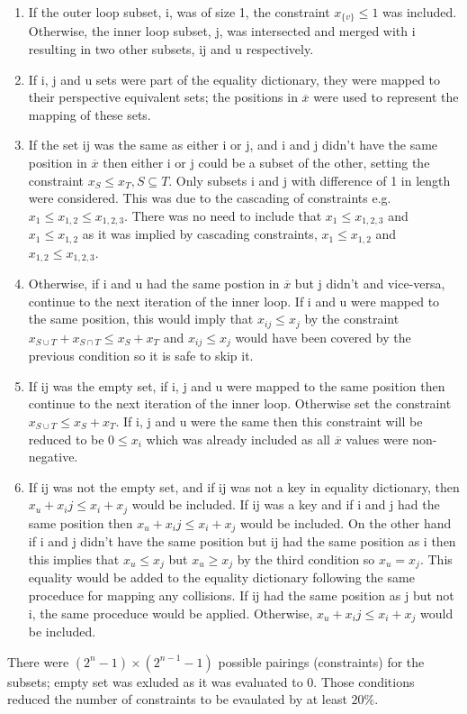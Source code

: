 \documentclass[11pt]{article}
\begin{document}
    \begin{enumerate}
        \item If the outer loop subset, i, was of size 1, the constraint $x_{\{v\}} \le 1$ was included. Otherwise, the inner loop subset, j, was intersected and merged with i resulting in two other subsets, ij and u respectively.
        \item If i, j and u sets were part of the equality dictionary, they were mapped to their perspective equivalent sets; the positions in $\overline{x}$ were used to represent the mapping of these sets. 
        \item If the set ij was the same as either i or j, and i and j didn't have the same position in $\overline{x}$ then either i or j could be a subset of the other, setting the constraint $x_S \le x_T, S\subseteq T$. Only subsets i and j with difference of 1 in length were considered. This was due to the cascading of constraints e.g. $x_1 \le x_{1,2} \le x_{1,2,3}$. There was no need to include that $x_1 \le x_{1,2,3}$ and $x_1 \le x_{1,2}$ as it was implied by cascading constraints, $x_1 \le x_{1,2}$ and $x_{1,2} \le x_{1,2,3}$. 
        \item Otherwise, if i and u had the same postion in $\overline{x}$ but j didn't and vice-versa, continue to the next iteration of the inner loop. If i and u were mapped to the same position, this would imply that $x_{ij} \le x_j$ by the constraint $x_{S\cup T} + x_{S\cap T} \le x_S + x_T$ and $x_{ij} \le x_j$ would have been covered by the previous condition so it is safe to skip it.
        \item If ij was the empty set, if i, j and u were mapped to the same position then continue to the next iteration of the inner loop. Otherwise set the constraint $x_{S\cup T} \le x_S + x_T$. If i, j and u were the same then this constraint will be reduced to be $0\le x_i$ which was already included as all $\overline{x}$ values were non-negative.
        \item If ij was not the empty set, and if ij was not a key in equality dictionary, then $x_u + x_ij\le x_i + x_j$ would be included. If ij was a key and if i and j had the same position then $x_u + x_ij\le x_i + x_j$ would be included. On the other hand if i and j didn't have the same position but ij had the same position as i then this implies that $x_u\le x_j$ but $x_u\ge x_j$ by the third condition so $x_u = x_j$. This equality would be added to the equality dictionary following the same proceduce for mapping any collisions. If ij had the same position as j but not i, the same proceduce would be applied. Otherwise, $x_u + x_ij\le x_i + x_j$ would be included. 
    \end{enumerate}
    There were $(2^n - 1) \times (2^{n-1} - 1)$ possible pairings (constraints) for the subsets; empty set was exluded as it was evaluated to 0. Those conditions reduced the number of constraints to be evaulated by at least $20\%$. 
\end{document}
